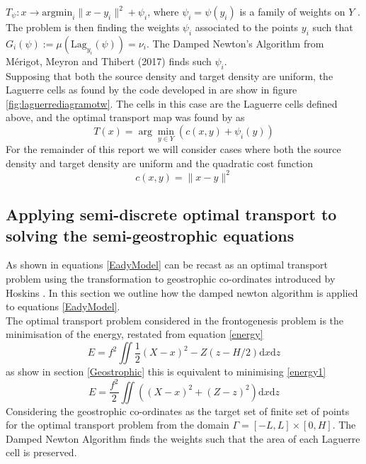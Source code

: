 $T_\psi: x \rightarrow \text{argmin}_i\| x - y_i \|^2 + \psi_i$, where $\psi_i = \psi(y_i)$ is a family of weights on $Y$ \cite{Merigot2017}.\\
\linebreak
 The problem is then finding the weights $\psi_i$ associated to the points $y_i$ such that $G_i(\psi) := \mu (\text{Lag}_{y_i}(\psi)) = \nu_i$. The Damped Newton's Algorithm from M\'{e}rigot, Meyron and Thibert (2017) \cite{Merigot2017} finds such $\psi_i$.
 \\
 \linebreak 
 Supposing that both the source density and target density are uniform, the Laguerre cells as found by the code developed in \cite{Merigot2017} are show in figure \ref{fig:laguerrediagramotw}. The cells in this case are the Laguerre cells defined above, and the optimal transport map was found by \cite{Merigot2017} as
 \begin{equation*}
 T(x) = \arg\min_{y\in Y}\left(c(x,y) + \psi_i(y)\right)
 \end{equation*}
For the remainder of this report we will consider cases where both the source density and target density are uniform and the quadratic cost function
\begin{equation*}
	c(x,y) = \| x - y \|^2
\end{equation*}
\subsection{Applying semi-discrete optimal transport to solving the semi-geostrophic equations}
As shown in \cite{Cullen2006a} equations \ref{EadyModel} can be recast as an optimal transport problem using the transformation to geostrophic co-ordinates introduced by Hoskins \cite{Hoskins1975}. In this section we outline how the damped newton algorithm is applied to equations \ref{EadyModel}.
\\
\linebreak
The optimal transport problem considered in the frontogenesis problem is the minimisation of the energy, restated from equation \ref{energy}
\begin{equation}
E = f^2 \iint \frac{1}{2}\left(X-x\right)^2 - Z\left(z - H/2\right)\textrm{d}x\textrm{d}z
\end{equation}
as show in section \ref{Geostrophic} this is equivalent to minimising \ref{energy1}
\begin{equation}
E = \frac{f^2}{2} \iint \left(\left(X-x\right)^2 + \left(Z - z\right)^2\right)\textrm{d}x\textrm{d}z
\end{equation}
Considering the geostrophic co-ordinates as the target set of finite set of points for the optimal transport problem from the domain $\Gamma = [-L,L] \times [0,H]$. The Damped Newton Algorithm finds the weights such that the area of each Laguerre cell is preserved.
